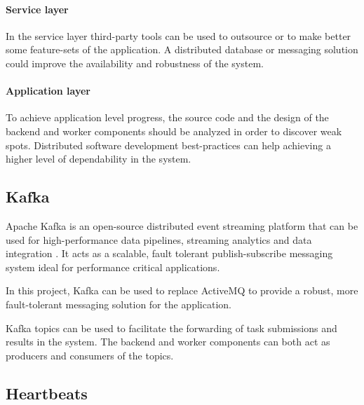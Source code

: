 \paragraph{Service layer} In the service layer third-party tools can be used to outsource or to make better some feature-sets of the application. A distributed database or messaging solution could improve the availability and robustness of the system.

\paragraph{Application layer} To achieve application level progress, the source code and the design of the backend and worker components should be analyzed in order to discover weak spots. Distributed software development best-practices can help achieving a higher level of dependability in the system.

\subsection{Kafka}


Apache Kafka is an open-source distributed event streaming platform that can be used for high-performance data pipelines, streaming analytics and data integration \cite{Kafka}. It acts as a scalable, fault tolerant publish-subscribe messaging system ideal for performance critical applications.

In this project, Kafka can be used to replace ActiveMQ to provide a robust, more fault-tolerant messaging solution for the application.

Kafka topics can be used to facilitate the forwarding of task submissions and results in the system. The backend and worker components can both act as producers and consumers of the topics.

\subsection{Heartbeats}


